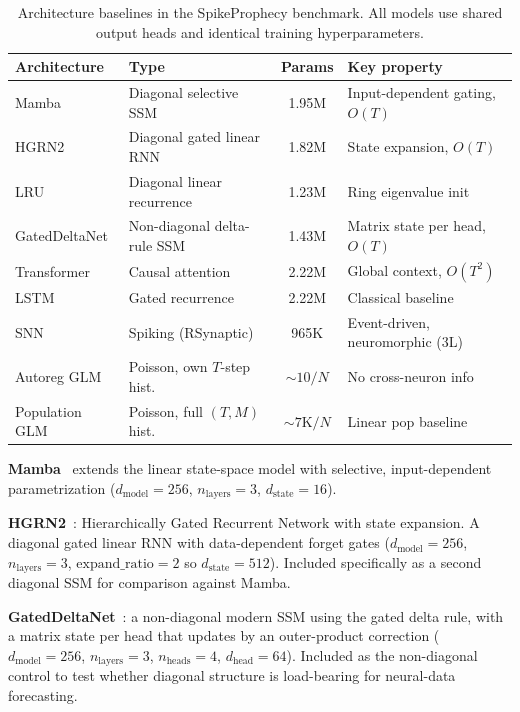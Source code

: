 \documentclass{article}
\begin{document}
\begin{table}[!ht]
  \caption{Architecture baselines in the SpikeProphecy benchmark.
    All models use shared output heads and identical training
    hyperparameters.}
  \label{tab:architectures}
  \centering
  \small
  \begin{tabular}{@{} l l c l @{}}
    \toprule
    \textbf{Architecture} & \textbf{Type} & \textbf{Params}
      & \textbf{Key property} \\
    \midrule
    Mamba     & Diagonal selective SSM & 1.95M & Input-dependent gating, $O(T)$ \\
    HGRN2     & Diagonal gated linear RNN & 1.82M & State expansion, $O(T)$ \\
    LRU    & Diagonal linear recurrence & 1.23M & Ring eigenvalue init \\
    GatedDeltaNet & Non-diagonal delta-rule SSM & 1.43M & Matrix state per head, $O(T)$ \\
    Transformer & Causal attention     & 2.22M & Global context, $O(T^2)$ \\
    LSTM      & Gated recurrence       & 2.22M & Classical baseline \\
    SNN       & Spiking (RSynaptic)    & 965K  & Event-driven, neuromorphic (3L) \\
    \midrule
    Autoreg GLM    & Poisson, own $T$-step hist. & ${\sim}10/N$  & No cross-neuron info \\
    Population GLM & Poisson, full $(T, M)$ hist. & ${\sim}7\text{K}/N$ & Linear pop baseline \\
    \bottomrule
  \end{tabular}
\end{table}

\textbf{Mamba}~\citep{gu2023mamba} extends the linear state-space model
with selective, input-dependent parametrization
($d_\mathrm{model}{=}256$, $n_\mathrm{layers}{=}3$, $d_\mathrm{state}{=}16$).

\textbf{HGRN2}~\citep{qin2024hgrn2}: Hierarchically Gated Recurrent
Network with state expansion. A diagonal gated linear RNN with
data-dependent forget gates ($d_\mathrm{model}{=}256$,
$n_\mathrm{layers}{=}3$, $\mathrm{expand\_ratio}{=}2$ so
$d_\mathrm{state}{=}512$).  Included specifically as a second diagonal
SSM for comparison against Mamba.

\textbf{GatedDeltaNet}~\citep{yang2024gateddelta}: a non-diagonal
modern SSM using the gated delta rule, with a matrix state per head
that updates by an outer-product correction
($d_\mathrm{model}{=}256$, $n_\mathrm{layers}{=}3$,
$n_\mathrm{heads}{=}4$, $d_\mathrm{head}{=}64$).  Included as the
non-diagonal control to test whether diagonal structure is load-bearing
for neural-data forecasting.
\end{document}
